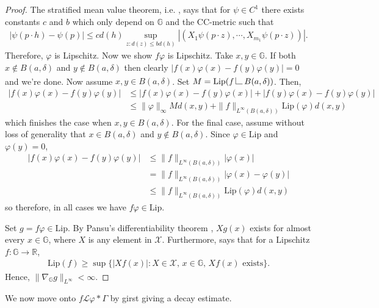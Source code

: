 \documentclass[12pt,a4paper,reqno]{amsart}
\newcommand{\cg}{\Gamma}
\renewcommand{\L}{\mathcal{L}}
\newcommand{\R}{\mathbb{R}}
\newcommand{\G}{\mathbb{G}}
\numberwithin{equation}{section}
\theoremstyle{definition}
\newcommand{\restrict}{\begin{picture}(12,12)
                        \put(2,0){\line(1,0){8}}
                        \put(2,0){\line(0,1){8}}
                       \end{picture}}
\begin{document}
\begin{proof}
The stratified mean value theorem, i.e. \cite[Theorem 20.3.1]{BLU}, says that for $\psi \in C^1$ there exists constants $c$ and $b$ which only depend on $\G$ and the CC-metric such that \begin{align*}
    |\psi (p \cdot h) - \psi(p)| \leq c d(h) \sup_{z : d(z)\leq b d(h)} |(X_1\psi(p \cdot z), \cdots, X_{m_1}\psi(p \cdot z))|.
\end{align*}
Therefore, $\varphi$ is Lipschitz. Now we show $f \varphi$ is Lipschitz. Take $x,y \in \G$. If both $x \notin B(a,\delta)$ and $y\notin B(a,\delta)$ then clearly $|f(x) \varphi(x) - f(y)\varphi(y)|= 0 $ and we're done. Now assume $x,y \in B(a,\delta)$. Set $M = \text{Lip}(f \restrict B(a,\delta))$. Then, \begin{align*}
    |f(x)\varphi(x) - f(y) \varphi(y)| &\leq |f(x)\varphi(x) - f(y) \varphi(x)| + |f(y)\varphi(x) - f(y) \varphi(y)| \\ &\leq \| \varphi\|_{\infty} Md(x,y) + \| f\|_{L^{\infty}(B(a,\delta))} \text{Lip}(\varphi) d(x,y)
\end{align*}
which finishes the case when $x,y \in B(a,\delta)$. For the final case, assume without loss of generality that $x\in B(a,\delta)$ and $y \notin B(a,\delta)$. Since $\varphi \in \text{Lip}$ and $\varphi(y) = 0$, \begin{align*}
    |f(x) \varphi(x) - f(y)\varphi(y)|  &\leq \| f\|_{L^{\infty}(B(a,\delta))} |\varphi(x)| \\ &= \|f \|_{L^{\infty}(B(a,\delta))}|\varphi(x) - \varphi(y)| \\ &\leq \|f \|_{L^{\infty}(B(a,\delta))}\text{Lip}(\varphi) d(x,y)
\end{align*}
so therefore, in all cases we have $f\varphi \in \text{Lip}$.

Set $g = f \varphi \in \text{Lip}$. By Pansu's differentiability theorem \cite{Pan}, $X g(x)$ exists for almost every $x \in \G$, where $X$ is any element in $\mathcal{X}$. Furthermore, \cite[Lemma 3.1]{LDPS} says that for a Lipschitz $f: \G \rightarrow \R$, \begin{align*}
    \text{Lip}(f) \geq \sup\{ |X f(x)|: X \in \mathcal{X}, \, x \in \G, \, Xf(x) \text{ exists}\}.
\end{align*} 
Hence, $\| \nabla_{\G} g\|_{L^{\infty}} < \infty$.
\end{proof}

We now move onto $f \L \varphi \ast \cg$ by girst giving a decay estimate.
\end{document}
